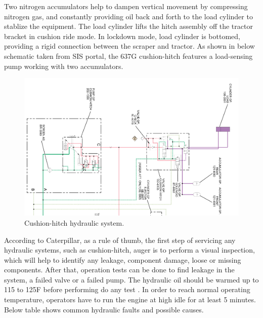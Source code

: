 \documentclass[a4paper,man,natbib]{apa6}
\begin{document}
Two nitrogen accumulators help to dampen vertical movement by compressing nitrogen gas, and constantly providing oil back and forth to the load cylinder to stablize the equipment. The load cylinder lifts the hitch assembly off the tractor bracket in cushion ride mode. In lockdown mode, load cylinder is bottomed, providing a rigid connection between the scraper and tractor. As shown in below schematic taken from SIS portal, the 637G cushion-hitch features a load-sensing pump working with two accumulators.

\begin{figure}[!ht]
\centering
\includegraphics[scale=0.5, angle=90]{cushion-hitch.jpg}
\centering\caption{\label{fig:cshh}Cushion-hitch hydraulic system. \citep{SISCat}}
\end{figure}
\FloatBarrier{}

According to Caterpillar, as a rule of thumb, the first step of servicing any hydraulic systems, such as cushion-hitch, auger is to perform a visual inspection, which will help to identify any leakage, component damage, loose or missing components. After that, operation tests can be done to find leakage in the system, a failed valve or a failed pump. The hydraulic oil should be warmed up to 115 to 125F before performing do any test \citep{SISCat}. In order to reach normal operating temperature, operators have to run the engine at high idle for at least 5 minutes\citep{SISCat}. Below table shows common hydraulic faults and possible causes.
\end{document}
